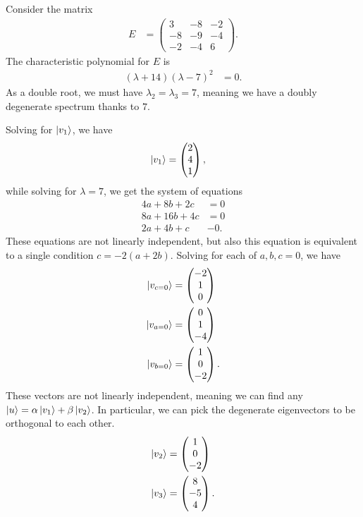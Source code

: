 \documentclass[10pt]{mypackage}
\begin{document}
\begin{example}
Consider the matrix
\begin{align*}
  E &= \begin{pmatrix}3 & -8 & -2 \\ -8 & -9 & -4 \\ -2 & -4 & 6\end{pmatrix}.
\end{align*}
The characteristic polynomial for $E$ is
\begin{align*}
  \left(\lambda + 14\right)\left(\lambda - 7\right)^2 &= 0.
\end{align*}
As a double root, we must have $\lambda_2 = \lambda_3 = 7$, meaning we have a doubly degenerate spectrum thanks to $7$.\newline

Solving for $\ket{v_1}$, we have
\begin{align*}
  \ket{v_1} &= \begin{pmatrix}2\\4\\1\end{pmatrix},
\end{align*}
while solving for $\lambda = 7$, we get the system of equations
\begin{align*}
  4a + 8b + 2c &= 0\\
  8a + 16b + 4c &= 0\\
  2a + 4b + c &- 0.
\end{align*}
These equations are not linearly independent, but also this equation is equivalent to a single condition $c = -2\left(a + 2b\right)$. Solving for each of $a,b,c = 0$, we have
\begin{align*}
  \ket{v_{c=0}} &= \begin{pmatrix}-2\\1\\0\end{pmatrix}\\
  \ket{v_{a=0}} &= \begin{pmatrix}0\\1\\-4\end{pmatrix}\\
  \ket{v_{b=0}} &= \begin{pmatrix}1\\0\\-2\end{pmatrix}.
\end{align*}
These vectors are not linearly independent, meaning we can find any $\ket{u} = \alpha \ket{v_1} + \beta\ket{v_2}$. In particular, we can pick the degenerate eigenvectors to be orthogonal to each other.
\begin{align*}
  \ket{v_2} &= \begin{pmatrix}1\\0\\-2\end{pmatrix}\\
  \ket{v_3} &= \begin{pmatrix}8\\-5\\4\end{pmatrix}.
\end{align*}


\end{example}
\end{document}
